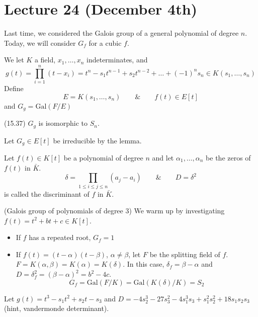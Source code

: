 \section{Lecture 24 (December 4th)}
\begin{rmk}
Last time, we considered the Galois group of a general polynomial of degree $n$. Today, we will consider $G_{f}$ for a cubic $f$.
\end{rmk}
\vspace{2ex}
\begin{recall}
We let $K$ a field, $x_1,\ldots, x_{n}$ indeterminates, and
\[g(t)=\prod^{n}_{i=1}(t-x_{i})=t^{n}-s_1t^{n-1}+s_2t^{n-2}+\ldots +(-1)^{n}s_{n}\in K(s_1,\ldots ,s_{n})\]
Define 
\[E=K(s_1,\ldots ,s_{n})\qquad\&\qquad f(t)\in E[t]\]
and $G_{g}=\mathrm{Gal}(F/E)$
\end{recall}
\vspace{2ex}
\begin{prop}
(15.37) $G_{g}$ is isomorphic to $S_{n}$.
\end{prop}
\vspace{2ex}
\begin{rmk}
Let $G_{g}\in E[t]$ be irreducible by the lemma.  
\end{rmk}
\vspace{2ex}
\begin{rmk}
Let $f(t)\in K[t]$ be a polynomial of degree $n$ and let $\alpha_1,\ldots ,\alpha _{n}$ be the zeros of $f(t)$ in $\bar{K}$.
\[\delta =\prod_{1\leq i\leq j\leq n}(a_{j}-a_{i})\qquad\&\qquad D=\delta ^2\]
is called the discriminant of $f$ in $\bar{K}$.
\end{rmk}
\vspace{2ex}
\begin{ex}
(Galois group of polynomials of degree 3) We warm up by investigating $f(t)=t^2+bt+c\in K[t]$.
\begin{itemize}
\item[(i)] If $f$ has a repeated root, $G_{f}=1$
\item[(ii)] If $f(t)=(t-\alpha )(t-\beta )$, $\alpha \ne \beta $, let $F$ be the splitting field of $f$. $F=K(\alpha ,\beta )=K(\alpha )=K(\delta )$. In this case, $\delta _{f}=\beta -\alpha $ and $D=\delta _{f}^2=(\beta -\alpha )^2=b^2-4c$.
\[G_{f}=\mathrm{Gal}(F/K)=\mathrm{Gal}(K(\delta )/K)=S_{2}\]
\end{itemize}
\end{ex}
\vspace{2ex}
\begin{rmk}
Let $g(t)=t^3-s_1t^2+s_2t-s_3$ and $D=-4s^3_{2}-27s_{3}^2-4s_{1}^3s_{3}+s_1^2s_2^2+18s_1s_2s_3$ (hint, vandermonde determinant). 
\end{rmk}
